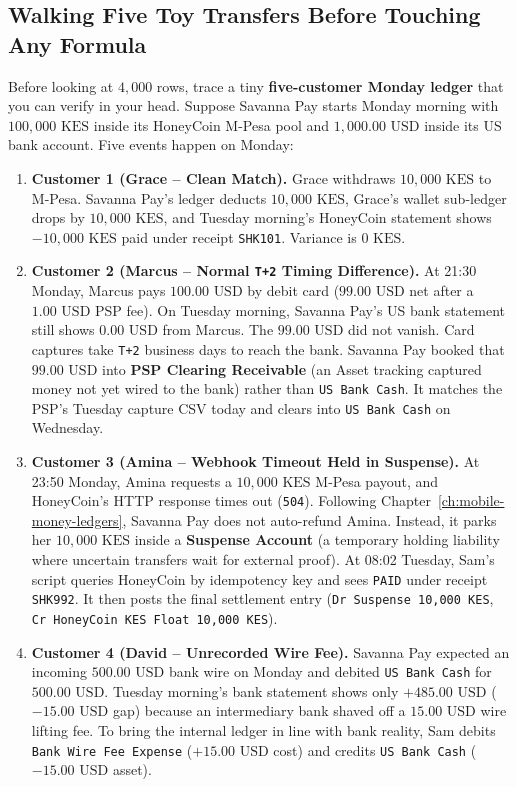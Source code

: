 \subsection{Walking Five Toy Transfers Before Touching Any Formula}

Before looking at $4{,}000$ rows, trace a tiny \textbf{five-customer Monday ledger} that you can verify in your head. Suppose Savanna Pay starts Monday morning with $100{,}000\text{ KES}$ inside its HoneyCoin M-Pesa pool and $1{,}000.00\text{ USD}$ inside its US bank account. Five events happen on Monday:

\begin{enumerate}
  \item \textbf{Customer 1 (Grace -- Clean Match).} Grace withdraws $10{,}000\text{ KES}$ to M-Pesa. Savanna Pay's ledger deducts $10{,}000\text{ KES}$, Grace's wallet sub-ledger drops by $10{,}000\text{ KES}$, and Tuesday morning's HoneyCoin statement shows $-10{,}000\text{ KES}$ paid under receipt \texttt{SHK101}. Variance is $0\text{ KES}$.
  \item \textbf{Customer 2 (Marcus -- Normal \texttt{T+2} Timing Difference).} At 21:30 Monday, Marcus pays $100.00\text{ USD}$ by debit card ($99.00\text{ USD}$ net after a $1.00\text{ USD}$ PSP fee). On Tuesday morning, Savanna Pay's US bank statement still shows $0.00\text{ USD}$ from Marcus. The $99.00\text{ USD}$ did not vanish. Card captures take \texttt{T+2} business days to reach the bank. Savanna Pay booked that $99.00\text{ USD}$ into \textbf{PSP Clearing Receivable} (an Asset tracking captured money not yet wired to the bank) rather than \texttt{US Bank Cash}. It matches the PSP's Tuesday capture CSV today and clears into \texttt{US Bank Cash} on Wednesday.
  \item \textbf{Customer 3 (Amina -- Webhook Timeout Held in Suspense).} At 23:50 Monday, Amina requests a $10{,}000\text{ KES}$ M-Pesa payout, and HoneyCoin's HTTP response times out (\texttt{504}). Following Chapter~\ref{ch:mobile-money-ledgers}, Savanna Pay does not auto-refund Amina. Instead, it parks her $10{,}000\text{ KES}$ inside a \textbf{Suspense Account} (a temporary holding liability where uncertain transfers wait for external proof). At 08:02 Tuesday, Sam's script queries HoneyCoin by idempotency key and sees \texttt{PAID} under receipt \texttt{SHK992}. It then posts the final settlement entry (\texttt{Dr Suspense 10,000 KES}, \texttt{Cr HoneyCoin KES Float 10,000 KES}).
  \item \textbf{Customer 4 (David -- Unrecorded Wire Fee).} Savanna Pay expected an incoming $500.00\text{ USD}$ bank wire on Monday and debited \texttt{US Bank Cash} for $500.00\text{ USD}$. Tuesday morning's bank statement shows only $+485.00\text{ USD}$ ($-15.00\text{ USD}$ gap) because an intermediary bank shaved off a $15.00\text{ USD}$ wire lifting fee. To bring the internal ledger in line with bank reality, Sam debits \texttt{Bank Wire Fee Expense} ($+15.00\text{ USD}$ cost) and credits \texttt{US Bank Cash} ($-15.00\text{ USD}$ asset).

\end{enumerate}
